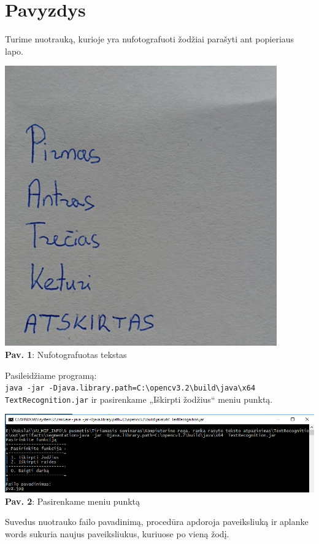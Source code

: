 \documentclass[a4paper,12pt]{article}
\begin{document}
\newpage
\section{Pavyzdys}
Turime nuotrauką, kurioje yra nufotografuoti žodžiai parašyti ant popieriaus lapo.
\begin{center}
	\includegraphics[scale=0.75]{img/1.png}\\
	\textbf{Pav. 1}: Nufotografuotas tekstas\\
\end{center}

Pasileidžiame programą:\\
\verb|java -jar -Djava.library.path=C:\opencv3.2\build\java\x64 TextRecognition.jar|
ir pasirenkame  „Iškirpti žodžius“ meniu punktą.

\begin{center}
	\includegraphics[scale=0.7]{img/2.png}\\
	\textbf{Pav. 2}: Pasirenkame meniu punktą\\
\end{center}
Suvedus nuotrauko failo pavadinimą, procedūra apdoroja paveiksliuką ir aplanke words sukuria naujus paveiksliukus, kuriuose po vieną žodį.
 
\end{document}

